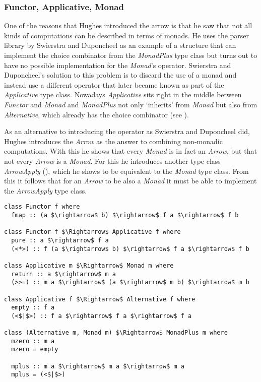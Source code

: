 \subsubsection{Functor, Applicative, Monad}
One of the reasons that Hughes introduced the arrow  is that he saw that not all kinds of computations can be described in terms of monads. He uses the parser library by Swierstra and Duponcheel  as an example of a structure that can implement the choice combinator from the \textit{MonadPlus} type class but turns out to have no possible implementation for the \textit{Monad}'s \code{(>>=)} operator. Swierstra and Duponcheel's solution to this problem is to discard the use of a monad and instead use a different operator \code{(<*>)} that later became known as part of the \textit{Applicative} type class. Nowadays \textit{Applicative} sits right in the middle between \textit{Functor} and \textit{Monad} and \textit{MonadPlus} not only `inherits' from \textit{Monad} but also from \textit{Alternative}, which already has the choice combinator (see ).

As an alternative to introducing the \code{(<*>)} operator as Swierstra and Duponcheel did, Hughes introduces the \textit{Arrow} as the answer to combining non-monadic computations. With this he shows that every \textit{Monad} is in fact an \textit{Arrow}, but that not every \textit{Arrow} is a \textit{Monad}. For this he introduces another type class \textit{ArrowApply} (), which he shows to be equivalent to the \textit{Monad} type class. From this it follows that for an \textit{Arrow} to be also a \textit{Monad} it must be able to implement the \textit{ArrowApply} type class.

\begin{minipage}{0.6\linewidth}
\begin{lstlisting}[style=HaskellStyle, caption={Type classes for monads}, label={lst:type-classes-for-monads}, captionpos=b, numbers=none]
class Functor f where
  fmap :: (a $\rightarrow$ b) $\rightarrow$ f a $\rightarrow$ f b

class Functor f $\Rightarrow$ Applicative f where
  pure :: a $\rightarrow$ f a
  (<*>) :: f (a $\rightarrow$ b) $\rightarrow$ f a $\rightarrow$ f b

class Applicative m $\Rightarrow$ Monad m where
  return :: a $\rightarrow$ m a
  (>>=) :: m a $\rightarrow$ (a $\rightarrow$ m b) $\rightarrow$ m b

class Applicative f $\Rightarrow$ Alternative f where
  empty :: f a
  (<$|$>) :: f a $\rightarrow$ f a $\rightarrow$ f a

class (Alternative m, Monad m) $\Rightarrow$ MonadPlus m where
  mzero :: m a
  mzero = empty
  
  mplus :: m a $\rightarrow$ m a $\rightarrow$ m a
  mplus = (<$|$>)
\end{lstlisting}
\end{minipage}
\begin{minipage}{0.4\linewidth}
\end{minipage}

